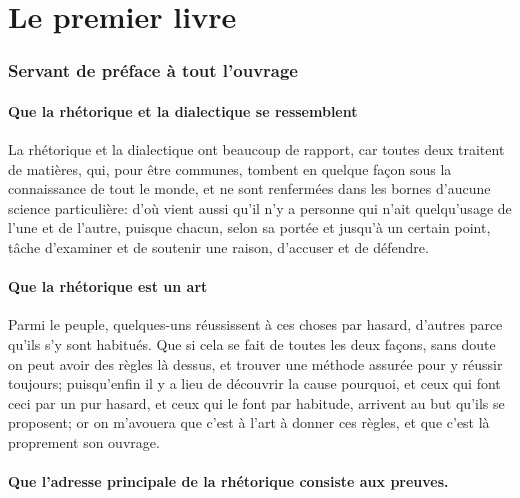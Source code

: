 
\part{Le premier livre}
\section{Servant de préface à tout l'ouvrage}

\subsection{Que la rhétorique et la dialectique se  ressemblent}

La rhétorique et la dialectique  ont beaucoup de rapport, car  toutes deux traitent de matières, qui, pour être communes, tombent
en quelque façon sous la connaissance de tout le monde, et ne sont renfermées dans les bornes d'aucune science particulière: d'où
vient aussi qu'il n'y a personne qui n'ait quelqu'usage de l'une et de l'autre, puisque chacun, selon sa portée et jusqu'à un
certain point, tâche d'examiner et de soutenir une raison, d'accuser et de défendre.

\subsection{Que la rhétorique est un art}

Parmi le peuple, quelques-uns réussissent à ces choses par hasard, d'autres parce qu'ils s'y sont habitués. Que si cela se fait
de toutes les deux façons, sans doute on peut avoir des règles là dessus, et trouver une méthode assurée pour y réussir toujours;
puisqu'enfin il y a lieu de découvrir la cause pourquoi, et ceux qui font ceci par un pur hasard, et ceux qui le font par habitude,
arrivent au but qu'ils se proposent; or on m'avouera que c'est à l'art à donner ces règles, et que c'est là proprement son ouvrage.

\subsection{Que l'adresse principale de la rhétorique consiste aux preuves.}

